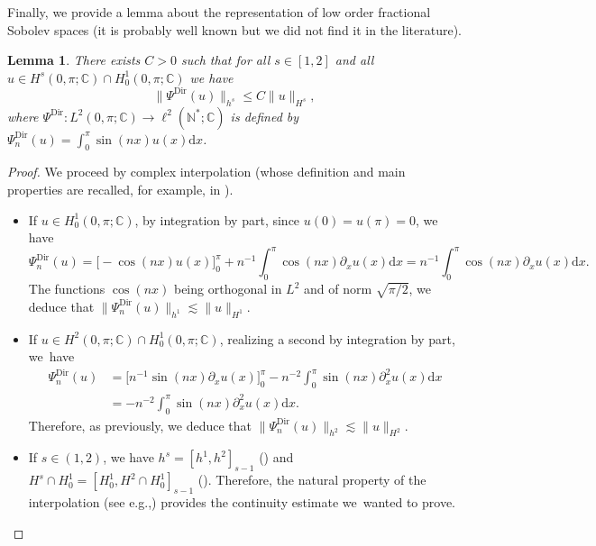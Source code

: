 \documentclass[11pt]{article}
\newcommand{\eg}{e.g.,\xspace}
\newtheorem{lemma}[theorem]{Lemma}
\theoremstyle{definition}
\begin{document}
Finally, we provide a lemma about the representation of low order fractional Sobolev spaces (it is probably well known but we did not find it in the literature).
\begin{lemma}
\label{lem_interpol}
There exists $C>0$ such that for all $s\in [1,2]$ and all $u\in H^s(0,\pi;\mathbb{C}) \cap H^1_0(0,\pi;\mathbb{C})$ we have
\[
\big\| \Psi^{\mathrm{Dir}}(u) \big\|_{h^s} \leq C \| u\|_{H^s},
\]
where $\Psi^{\mathrm{Dir}}: L^2(0,\pi;\mathbb{C}) \to \ell^2(\mathbb{N}^*;\mathbb{C})$ is defined by $\Psi^{\mathrm{Dir}}_n(u) = \int_0^\pi \sin(nx) u(x) \mathrm{d}x$.
\end{lemma}
\begin{proof} We proceed by complex interpolation (whose definition and main properties are recalled, for example, in \cite{Tri78,Agra15}).
\begin{itemize}
\item
If $u\in H^1_0(0,\pi;\mathbb{C})$, by integration by part, since $u(0)=u(\pi)=0$, we have
\[
\Psi^{\mathrm{Dir}}_n(u) = \big[-\cos(nx) u(x) \big]_0^\pi + n^{-1} \int_0^\pi \cos(nx) \partial_x u(x) \mathrm{d}x = n^{-1} \int_0^\pi \cos(nx) \partial_x u(x) \mathrm{d}x.
\]
The functions $\cos(nx)$ being orthogonal in $L^2$ and of norm $\sqrt{\pi/2}$, we deduce that $\| \Psi^{\mathrm{Dir}}_n(u) \|_{h^1} \lesssim \|u\|_{H^1}$.

\item
If $u\in H^2(0,\pi;\mathbb{C}) \cap H^1_0(0,\pi;\mathbb{C})$, realizing a second by integration by part, we~have
\begin{equation*}
\begin{split}
\Psi^{\mathrm{Dir}}_n(u) &= \big[n^{-1} \sin(nx) \partial_x u(x) \big]_0^\pi - n^{-2} \int_0^\pi \sin(nx) \partial_x^2 u(x) \mathrm{d}x \\
&= - n^{-2} \int_0^\pi \sin(nx) \partial_x^2 u(x) \mathrm{d}x.
\end{split}
\end{equation*}
Therefore, as previously, we deduce that $\| \Psi^{\mathrm{Dir}}_n(u) \|_{h^2} \lesssim \|u\|_{H^2}$.

\item
If $s\in (1,2)$, we have $h^s = [h^1,h^2]_{s-1}$ (\cite[Th.\ p.\,130]{Tri78}) and $H^s \cap H^1_0 = [H^1_0,H^2\cap H^1_0]_{s-1}$ (\cite[Th.\,13.2.2 p.\,198]{Agra15}). Therefore, the natural property of the interpolation (see \eg \cite[Th.\,13.2.1 p.\,197]{Agra15}) provides the continuity estimate we~wanted to prove.\qedhere
\end{itemize}
\end{proof}
\end{document}
